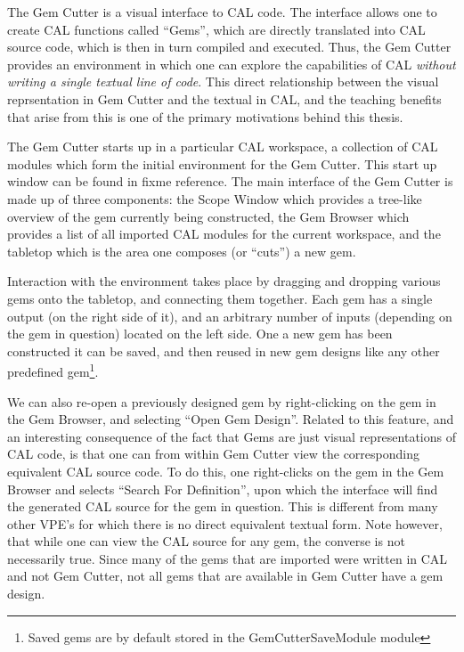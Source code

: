 The Gem Cutter is a visual interface to CAL code.  The interface allows one to create CAL functions called ``Gems'', which are directly translated into CAL source code, which is then in turn compiled and executed.  Thus, the Gem Cutter provides an environment in which one can explore the capabilities of CAL \emph{without writing a single textual line of code}.  This direct relationship between the visual reprsentation in Gem Cutter and the textual in CAL, and the teaching benefits that arise from this is one of the primary motivations behind this thesis.

The Gem Cutter starts up in a particular CAL workspace, a collection of CAL modules which form the initial environment for the Gem Cutter.  This start up window can be found in fixme reference.  The main interface of the Gem Cutter is made up of three components: the Scope Window which provides a tree-like overview of the gem currently being constructed, the Gem Browser which provides a list of all imported CAL modules for the current workspace, and the tabletop which is the area one composes (or ``cuts'') a new gem.

Interaction with the environment takes place by dragging and dropping various gems onto the tabletop, and connecting them together.  Each gem has a single output (on the right side of it), and an arbitrary number of inputs (depending on the gem in question) located on the left side.  One a new gem has been constructed it can be saved, and then reused in new gem designs like any other predefined gem\footnote{Saved gems are by default stored in the GemCutterSaveModule module}.

We can also re-open a previously designed gem by right-clicking on the gem in the Gem Browser, and selecting ``Open Gem Design''.  Related to this feature, and an interesting consequence of the fact that Gems are just visual representations of CAL code, is that one can from within Gem Cutter view the corresponding equivalent CAL source code.  To do this, one right-clicks on the gem in the Gem Browser and selects ``Search For Definition'', upon which the interface will find the generated CAL source for the gem in question.  This is different from many other VPE's for which there is no direct equivalent textual form.  Note however, that while one can view the CAL source for any gem, the converse is not necessarily true.  Since many of the gems that are imported were written in CAL and not Gem Cutter, not all gems that are available in Gem Cutter have a gem design.


